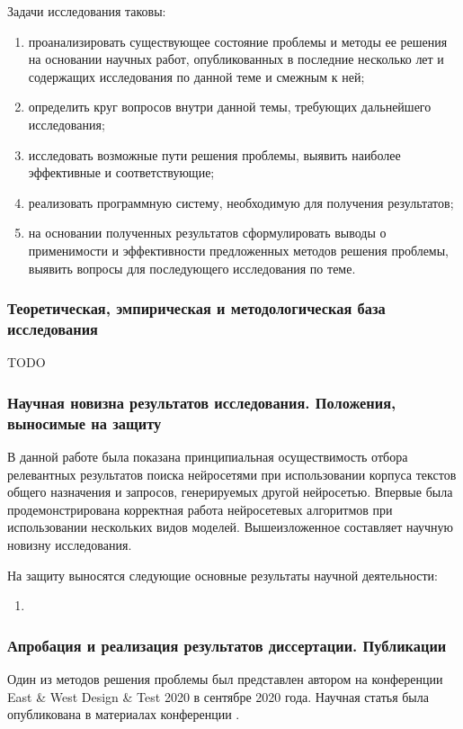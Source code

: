 Задачи исследования таковы:
\begin{enumerate}[1)]
    \item проанализировать существующее состояние проблемы и методы ее решения на основании научных работ, опубликованных
          в последние несколько лет и содержащих исследования по данной теме и смежным к ней;
    \item определить круг вопросов внутри данной темы, требующих дальнейшего исследования;
    \item исследовать возможные пути решения проблемы, выявить наиболее эффективные и соответствующие;
    \item реализовать программную систему, необходимую для получения результатов;
    \item на основании полученных результатов сформулировать выводы о применимости и эффективности предложенных
          методов решения проблемы, выявить вопросы для последующего исследования по теме.
\end{enumerate}

\subsubsection{Теоретическая, эмпирическая и методологическая база исследования}
TODO
\subsubsection{Научная новизна результатов исследования. Положения, выносимые на защиту}
В данной работе была показана принципиальная осуществимость отбора релевантных результатов поиска нейросетями при использовании
корпуса текстов общего назначения и запросов, генерируемых другой нейросетью. Впервые была продемонстрирована корректная
работа нейросетевых алгоритмов при использовании нескольких видов моделей.
Вышеизложенное составляет научную новизну исследования.

На защиту выносятся следующие основные результаты научной деятельности:
\begin{enumerate}[1)]
    \item
\end{enumerate}

\subsubsection{Апробация и реализация результатов диссертации. Публикации}
Один из методов решения проблемы был представлен автором на конференции East \& West Design \& Test 2020 в сентябре 2020 года.
Научная статья была опубликована в материалах конференции \cite{9224840}. %

